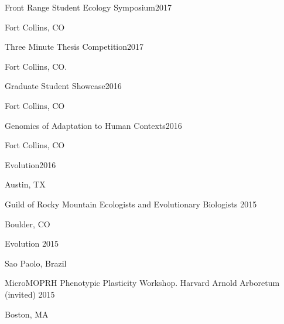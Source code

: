 \documentclass[12pt,english]{article}
\begin{document}
\hspace*{1.0em}Front Range Student Ecology Symposium\hfill 2017 \par
\hspace*{2.0em}Fort Collins, CO \par\vspace{0.5ex}

\hspace*{1.0em}Three Minute Thesis Competition\hfill 2017 \par
\hspace*{2.0em}Fort Collins, CO. \par\vspace{0.5ex}

\hspace*{1.0em}Graduate Student Showcase\hfill 2016 \par
\hspace*{2.0em}Fort Collins, CO \par\vspace{0.5ex}

\hspace*{1.0em}Genomics of Adaptation to Human Contexts\hfill 2016 \par
\hspace*{2.0em}Fort Collins, CO \par\vspace{0.5ex}

\hspace*{1.0em}Evolution\hfill 2016 \par
\hspace*{2.0em}Austin, TX \par\vspace{0.5ex}

\hspace*{1.0em}Guild of Rocky Mountain Ecologists and Evolutionary Biologists \hfill 2015 \par
\hspace*{2.0em}Boulder, CO \par\vspace{0.5ex}

\hspace*{1.0em}Evolution \hfill 2015 \par
\hspace*{2.0em}Sao Paolo, Brazil \par\vspace{0.5ex}

\hspace*{1.0em}MicroMOPRH Phenotypic Plasticity Workshop. Harvard Arnold Arboretum (invited) \hfill 2015 \par
\hspace*{2.0em}Boston, MA  \par\vspace{0.5ex}
\end{document}
